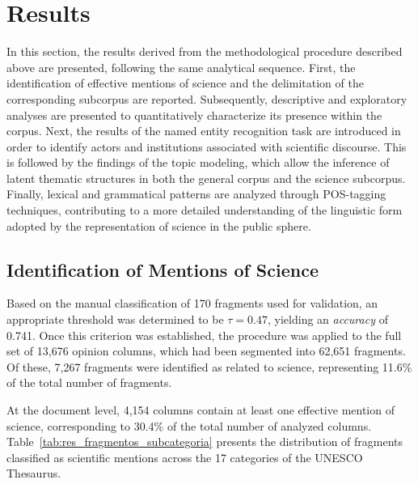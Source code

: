 \documentclass[pdflatex,sn-mathphys-num, iicol]{sn-jnl}
\begin{document}
	\section{Results}\label{sec:results}
	
	In this section, the results derived from the methodological procedure described above are presented, following the same analytical sequence. First, the identification of effective mentions of science and the delimitation of the corresponding subcorpus are reported. Subsequently, descriptive and exploratory analyses are presented to quantitatively characterize its presence within the corpus. Next, the results of the named entity recognition task are introduced in order to identify actors and institutions associated with scientific discourse. This is followed by the findings of the topic modeling, which allow the inference of latent thematic structures in both the general corpus and the science subcorpus. Finally, lexical and grammatical patterns are analyzed through POS-tagging techniques, contributing to a more detailed understanding of the linguistic form adopted by the representation of science in the public sphere.
	
	\subsection{Identification of Mentions of Science}\label{subsec:mentions}
	
	Based on the manual classification of 170 fragments used for validation, an appropriate threshold was determined to be $\tau = 0.47$, yielding an \emph{accuracy} of 0.741. Once this criterion was established, the procedure was applied to the full set of 13,676 opinion columns, which had been segmented into 62,651 fragments. Of these, 7,267 fragments were identified as related to science, representing 11.6\% of the total number of fragments.
	
	At the document level, 4,154 columns contain at least one effective mention of science, corresponding to 30.4\% of the total number of analyzed columns. Table~\ref{tab:res_fragmentos_subcategoria} presents the distribution of fragments classified as scientific mentions across the 17 categories of the UNESCO Thesaurus.
	
\end{document}
